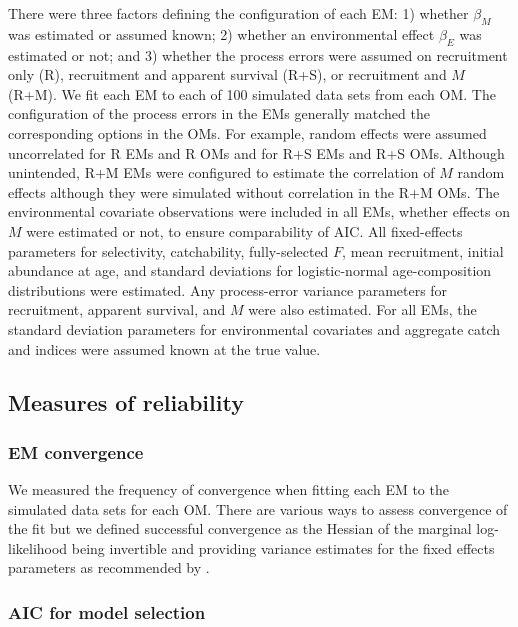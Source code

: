 \documentclass[
  12pt,
]{article}
\begin{document}
There were three factors defining the configuration of each EM: 1)
whether \(\beta_M\) was estimated or assumed known; 2) whether an
environmental effect \(\beta_E\) was estimated or not; and 3) whether
the process errors were assumed on recruitment only (R), recruitment and
apparent survival (R+S), or recruitment and \(M\) (R+M). We fit each EM
to each of 100 simulated data sets from each OM. The configuration of
the process errors in the EMs generally matched the corresponding
options in the OMs. For example, random effects were assumed
uncorrelated for R EMs and R OMs and for R+S EMs and R+S OMs. Although
unintended, R+M EMs were configured to estimate the correlation of \(M\)
random effects although they were simulated without correlation in the
R+M OMs. The environmental covariate observations were included in all
EMs, whether effects on \(M\) were estimated or not, to ensure
comparability of AIC. All fixed-effects parameters for selectivity,
catchability, fully-selected \(F\), mean recruitment, initial abundance
at age, and standard deviations for logistic-normal age-composition
distributions were estimated. Any process-error variance parameters for
recruitment, apparent survival, and \(M\) were also estimated. For all
EMs, the standard deviation parameters for environmental covariates and
aggregate catch and indices were assumed known at the true value.

\subsection*{Measures of reliability}\label{measures-of-reliability}

\subsubsection*{EM convergence}\label{em-convergence}

We measured the frequency of convergence when fitting each EM to the
simulated data sets for each OM. There are various ways to assess
convergence of the fit \citep[e.g.,][]{carvalhoetal21} but we defined
successful convergence as the Hessian of the marginal log-likelihood
being invertible and providing variance estimates for the fixed effects
parameters as recommended by \citet{milleretal26}.

\subsubsection*{AIC for model selection}\label{aic-for-model-selection}
\end{document}
